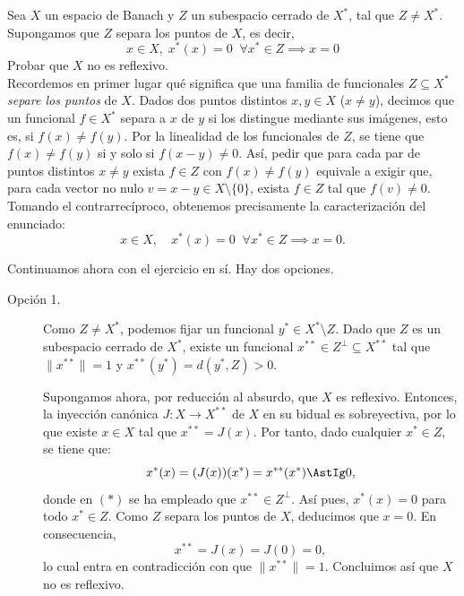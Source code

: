 \begin{ejercicio}
Sea $X$ un espacio de Banach y $Z$ un subespacio cerrado de $X^*$, tal que $Z \neq X^*$. Supongamos que $Z$ separa los puntos de $X$, es decir,
\[
x \in X, \; x^*(x) = 0 \;\; \forall x^* \in Z \implies x = 0
\]
Probar que $X$ no es reflexivo.\\

    Recordemos en primer lugar qué significa que una familia de funcionales $Z \subseteq X^*$ \textit{separe los puntos} de $X$. Dados dos puntos distintos $x, y \in X$ ($x \neq y$), decimos que un funcional $f \in X^*$ separa a $x$ de $y$ si los distingue mediante sus imágenes, esto es, si $f(x) \neq f(y)$. Por la linealidad de los funcionales de $Z$, se tiene que $f(x) \neq f(y)$ si y solo si $f(x - y) \neq 0$. Así, pedir que para cada par de puntos distintos $x \neq y$ exista $f \in Z$ con $f(x) \neq f(y)$ equivale a exigir que, para cada vector no nulo $v = x - y \in X \setminus \{0\}$, exista $f \in Z$ tal que $f(v) \neq 0$. Tomando el contrarrecíproco, obtenemos precisamente la caracterización del enunciado:
    \[
        x \in X, \quad x^*(x) = 0 \;\; \forall x^* \in Z \implies x = 0.
    \]

    Continuamos ahora con el ejercicio en sí. Hay dos opciones.
    \begin{description}
        \item[Opción 1.] Como $Z \neq X^*$, podemos fijar un funcional $y^* \in X^* \setminus Z$. Dado que $Z$ es un subespacio cerrado de $X^*$, existe un funcional $x^{**} \in Z^\perp \subseteq X^{**}$ tal que $\|x^{**}\| = 1$ y $x^{**}(y^*) = d(y^*, Z) > 0$.

        Supongamos ahora, por reducción al absurdo, que $X$ es reflexivo. Entonces, la inyección canónica $J : X \longrightarrow X^{**}$ de $X$ en su bidual es sobreyectiva, por lo que existe $x \in X$ tal que $x^{**} = J(x)$. Por tanto, dado cualquier $x^* \in Z$, se tiene que:
        \begin{equation*}
            x^*(x) = (J(x))(x^*) = x^{**}(x^*) \AstIg 0,
        \end{equation*}
        donde en $(\ast)$ se ha empleado que $x^{**} \in Z^\perp$. Así pues, $x^*(x) = 0$ para todo $x^* \in Z$. Como $Z$ separa los puntos de $X$, deducimos que $x = 0$. En consecuencia,
        \[
            x^{**} = J(x) = J(0) = 0,
        \]
        lo cual entra en contradicción con que $\|x^{**}\| = 1$. Concluimos así que $X$ no es reflexivo.
        

\end{description}
\end{ejercicio}
